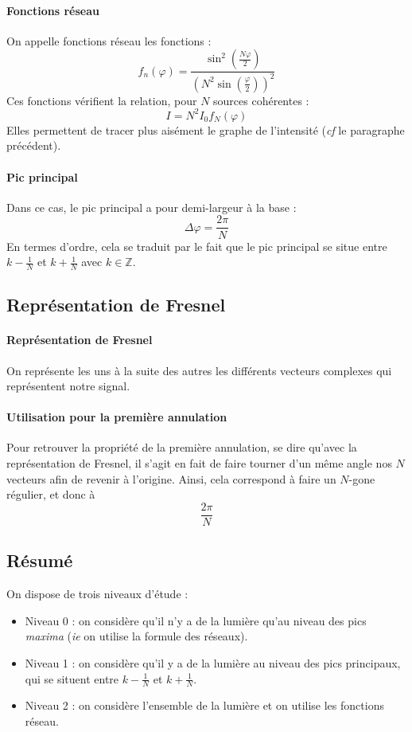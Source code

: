 \documentclass[french]{book}
\theoremstyle{plain}
\theoremstyle{definition}
\theoremstyle{remark}
\newcommand{\Z}{\mathbb{Z}}
\begin{document}
\paragraph{Fonctions réseau} On appelle fonctions réseau les fonctions : $$f_n(\varphi)=\frac{\sin^2\left(\frac{N\varphi}{2}\right)}{\left(N^2\sin\left(\frac{\varphi}{2}\right)\right)^2}$$ Ces fonctions vérifient la relation, pour $N$ sources cohérentes : $$I=N^2I_0f_N(\varphi)$$ Elles permettent de tracer plus aisément le graphe de l'intensité (\textit{cf} le paragraphe précédent).
\paragraph{Pic principal} Dans ce cas, le pic principal a pour demi-largeur à la base : $$\Delta\varphi=\frac{2\pi}{N}$$ En termes d'ordre, cela se traduit par le fait que le pic principal se situe entre $k-\displaystyle\frac{1}{N}$ et $k+\displaystyle\frac{1}{N}$ avec $k\in\Z$.
\subsection{Représentation de Fresnel}
\paragraph{Représentation de Fresnel} On représente les uns à la suite des autres les différents vecteurs complexes qui représentent notre signal.
\paragraph{Utilisation pour la première annulation} Pour retrouver la propriété de la première annulation, se dire qu'avec la représentation de Fresnel, il s'agit en fait de faire tourner d'un même angle nos $N$ vecteurs afin de revenir à l'origine. Ainsi, cela correspond à faire un $N$-gone régulier, et donc à $$\frac{2\pi}{N}$$
\subsection{Résumé} On dispose de trois niveaux d'étude : 
\begin{itemize}
	\item Niveau 0 : on considère qu'il n'y a de la lumière qu'au niveau des pics \textit{maxima} (\textit{ie} on utilise la formule des réseaux).
	\item Niveau 1 : on considère qu'il y a de la lumière au niveau des pics principaux, qui se situent entre $k-\displaystyle\frac{1}{N}$ et $k+\displaystyle\frac{1}{N}$.
	\item Niveau 2 : on considère l'ensemble de la lumière et on utilise les fonctions réseau.
\end{itemize}
\end{document}
